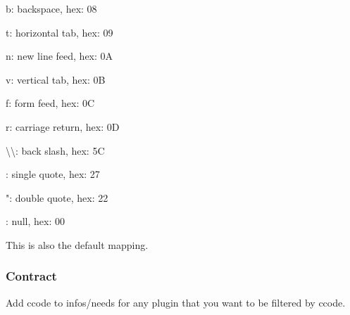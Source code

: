 \begin{DoxyItemize}
\item {\ttfamily b}\+: backspace, hex\+: 08
\item {\ttfamily t}\+: horizontal tab, hex\+: 09
\item {\ttfamily n}\+: new line feed, hex\+: 0A
\item {\ttfamily v}\+: vertical tab, hex\+: 0B
\item {\ttfamily f}\+: form feed, hex\+: 0C
\item {\ttfamily r}\+: carriage return, hex\+: 0D
\item {\ttfamily \textbackslash{}\textbackslash{}}\+: back slash, hex\+: 5C
\item {\ttfamily \textquotesingle{}}\+: single quote, hex\+: 27
\item {\ttfamily "}\+: double quote, hex\+: 22
\item {}\+: null, hex\+: 00
\end{DoxyItemize}

This is also the default mapping.

\subsubsection*{Contract}

Add {\ttfamily ccode} to {\ttfamily infos/needs} for any plugin that you want to be filtered by ccode. 